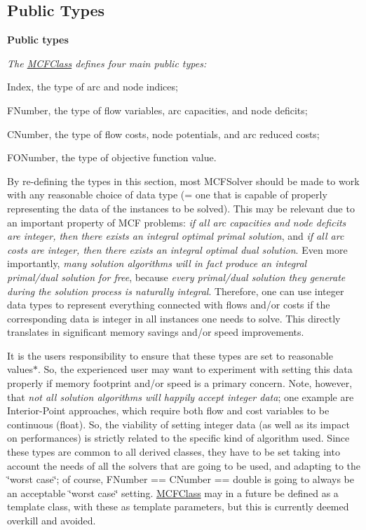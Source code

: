 \subsection*{Public Types}
\begin{Indent}\textbf{ Public types}\par
{\em The \mbox{\hyperlink{class_m_c_f_class}{M\+C\+F\+Class}} defines four main public types\+:


\begin{DoxyItemize}
\item Index, the type of arc and node indices;
\item F\+Number, the type of flow variables, arc capacities, and node deficits;
\item C\+Number, the type of flow costs, node potentials, and arc reduced costs;
\item F\+O\+Number, the type of objective function value.
\end{DoxyItemize}

By re-\/defining the types in this section, most M\+C\+F\+Solver should be made to work with any reasonable choice of data type (= one that is capable of properly representing the data of the instances to be solved). This may be relevant due to an important property of M\+CF problems\+: {\itshape if all arc capacities and node deficits are integer, then there exists an integral optimal primal solution}, and {\itshape if all arc costs are integer, then there exists an integral optimal dual solution}. Even more importantly, {\itshape many solution algorithms will in fact produce an integral primal/dual solution for free}, because {\itshape every primal/dual solution they generate during the solution process is naturally integral}. Therefore, one can use integer data types to represent everything connected with flows and/or costs if the corresponding data is integer in all instances one needs to solve. This directly translates in significant memory savings and/or speed improvements.

It is the user\textquotesingle{}s responsibility to ensure that these types are set to reasonable values$\ast$. So, the experienced user may want to experiment with setting this data properly if memory footprint and/or speed is a primary concern. Note, however, that {\itshape not all solution algorithms will happily accept integer data}; one example are Interior-\/\+Point approaches, which require both flow and cost variables to be continuous (float). So, the viability of setting integer data (as well as its impact on performances) is strictly related to the specific kind of algorithm used. Since these types are common to all derived classes, they have to be set taking into account the needs of all the solvers that are going to be used, and adapting to the \char`\"{}worst case\char`\"{}; of course, F\+Number == C\+Number == double is going to always be an acceptable \char`\"{}worst case\char`\"{} setting. \mbox{\hyperlink{class_m_c_f_class}{M\+C\+F\+Class}} may in a future be defined as a template class, with these as template parameters, but this is currently deemed overkill and avoided.

}
\end{Indent}
